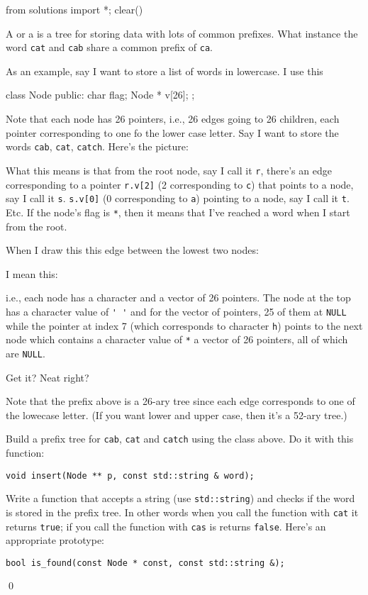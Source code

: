 \begin{python0}
from solutions import *; clear()
\end{python0}

A  or a  is a tree for storing data with
lots of common prefixes.
What instance the word \texttt{cat} and \texttt{cab}
share a common prefix of \texttt{ca}.

As an example, say I want to store a list of words
in lowercase.
I use this
\begin{console}
class Node
{
public:
    char flag;
    Node * v[26];
};
\end{console}
Note that each node has 26 pointers, i.e., 26 edges going
to 26 children, each pointer corresponding to one fo the lower case letter.
Say I want to store the words \texttt{cab}, \texttt{cat}, \texttt{catch}.
Here's the picture:

What this means is that from the root node, say I call it
\verb!r!, there's an edge corresponding
to a pointer \verb!r.v[2]! (2 corresponding to \texttt{c})
that points to a node, say I call it \texttt{s}.
\texttt{s.v[0]} (0 corresponding to \texttt{a})
pointing to a node, say I call it \texttt{t}.
Etc.
If the node's flag is \texttt{*}, then it means that
I've reached a word when I start from the root.

When I draw this this edge between the lowest two nodes:



I mean this:



i.e., each node has a character and a vector of 26 pointers.
The node at the top has a character value of \verb!' '! and for the vector
of pointers, 25 of them at \texttt{NULL} while the
pointer at index 7 (which corresponds to character \texttt{h})
points to the next node which contains a character value of \texttt{*}
a vector of 26 pointers, all of which are \texttt{NULL}.

Get it? Neat right?

Note that the prefix above is a 26-ary tree since
each edge corresponds to one of the lowecase letter.
(If you want lower and upper case, then it's a 52-ary tree.)

\begin{ex}
Build a prefix tree for \texttt{cab}, \texttt{cat} and
\texttt{catch} using the class above.
Do it with this function:
\begin{Verbatim}[frame=single]
void insert(Node ** p, const std::string & word);
\end{Verbatim}
Write a function that accepts a string (use
\texttt{std::string}) and checks if the word
is stored in the prefix tree.
In other words when you call the function with \texttt{cat}
it returns \texttt{true};
if you call the function with \texttt{cas} is returns \texttt{false}.
Here's an appropriate prototype:
\begin{Verbatim}[frame=single]
bool is_found(const Node * const, const std::string &);
\end{Verbatim}
\qed
\end{ex}

